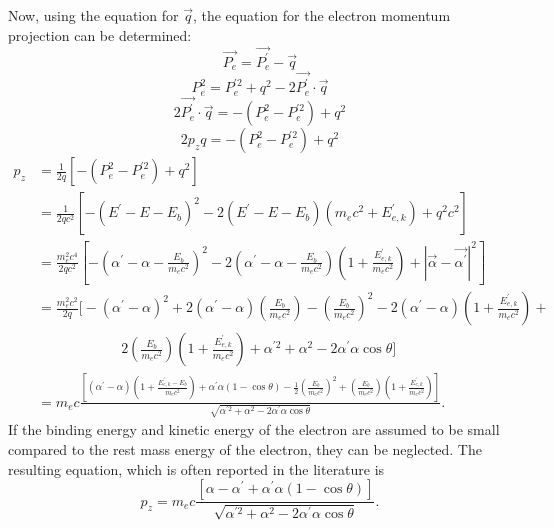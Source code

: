 Now, using the equation for $\vec{q}$, the equation for the electron momentum 
projection can be determined:
\begin{equation*}
  \vec{P_e} = \vec{P_e^{'}} - \vec{q}
\end{equation*}
\begin{equation*}
  P_e^2 = P_e^{'2} + q^2 - 2\vec{P_e^{'}}\cdot\vec{q}
\end{equation*}
\begin{equation*}
  2\vec{P_e^{'}}\cdot\vec{q} = -\left(P_e^2 - P_e^{'2}\right) + q^2
\end{equation*}
\begin{equation*}
  2p_zq = -\left(P_e^2 - P_e^{'2}\right) + q^2 \nonumber
\end{equation*}
\begin{align}
  p_z & = \frac{1}{2q}\left[-\left(P_e^2 - P_e^{'2}\right) + q^2\right] 
  \nonumber \\
  & = \frac{1}{2qc^2}\left[-(E^{'}-E-E_b)^2 - 2(E^{'}-E-E_b)(m_ec^2+E_{e,k}^{'})
    +q^2c^2\right] \nonumber \\
  & = \frac{m_e^2c^4}{2qc^2}\left[
    -\left(\alpha^{'}-\alpha-\frac{E_b}{m_ec^2}\right)^2 -
    2\left(\alpha^{'}-\alpha-\frac{E_b}{m_ec^2}\right)
    \left(1 + \frac{E_{e,k}^{'}}{m_ec^2}\right) + 
    \left|\vec{\alpha} - \vec{\alpha^{'}}\right|^2\right] \nonumber \\
  & = \frac{m_e^2c^2}{2q}\Bigg[-(\alpha^{'}-\alpha)^2 + 
    2(\alpha^{'}-\alpha)\left(\frac{E_b}{m_ec^2}\right) - 
    \left(\frac{E_b}{m_ec^2}\right)^2 -
    2(\alpha^{'}-\alpha)\left(1 + \frac{E_{e,k}^{'}}{m_ec^2}\right) + \nonumber \\
  & \qquad \qquad \qquad
    2\left(\frac{E_b}{m_ec^2}\right)\left(1 + \frac{E_{e,k}^{'}}{m_ec^2}\right) +
    \alpha^{'2} + \alpha^2 - 2\alpha^{'}\alpha\cos{\theta}\Bigg] \nonumber \\
  & = m_ec\frac{\left[(\alpha^{'}-\alpha)\left(1 + \frac{E_{e,k}^{'} - E_b}{m_ec^2}
    \right) + \alpha^{'}\alpha(1-\cos{\theta}) -
    \frac{1}{2}\left(\frac{E_b}{m_ec^2}\right)^2 + 
    \left(\frac{E_b}{m_ec^2}\right)\left(1 + \frac{E_{e,k}^{'}}{m_ec^2}\right)
    \right]} {\sqrt{\alpha^{'2} + \alpha^2 - 2\alpha^{'}\alpha\cos{\theta}}}.
\end{align}
If the binding energy and kinetic energy of the electron are assumed to be 
small compared to the rest mass energy of the electron, they can be neglected. 
The resulting equation, which is often reported in the literature is
\begin{equation}
  p_z = m_ec\frac{\left[\alpha - \alpha^{'} + \alpha^{'}\alpha(1-\cos{\theta})
      \right]}{\sqrt{\alpha^{'2} + \alpha^2 - 2\alpha^{'}\alpha\cos{\theta}}}.
\end{equation}

